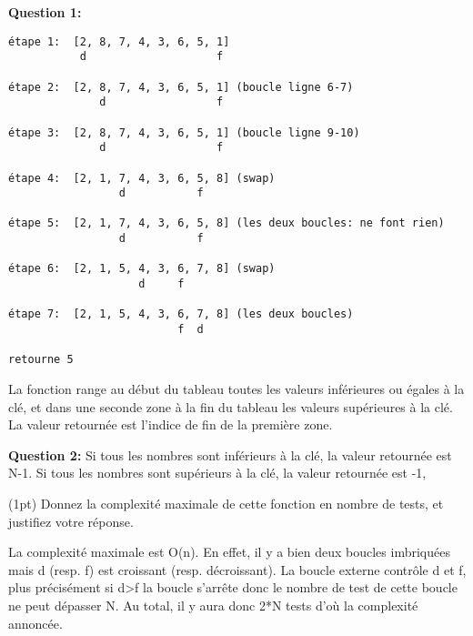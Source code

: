 \documentclass[10pt]{article}\usepackage[correction,nu]{esial}
\begin{document}
\begin{Reponse}
\noindent\textbf{Question 1:} 
\begin{Verbatim}[numbers=none]
étape 1:  [2, 8, 7, 4, 3, 6, 5, 1]
           d                    f

étape 2:  [2, 8, 7, 4, 3, 6, 5, 1] (boucle ligne 6-7)
              d                 f

étape 3:  [2, 8, 7, 4, 3, 6, 5, 1] (boucle ligne 9-10)
              d                 f

étape 4:  [2, 1, 7, 4, 3, 6, 5, 8] (swap)
                 d           f    

étape 5:  [2, 1, 7, 4, 3, 6, 5, 8] (les deux boucles: ne font rien)
                 d           f

étape 6:  [2, 1, 5, 4, 3, 6, 7, 8] (swap)
                    d     f   

étape 7:  [2, 1, 5, 4, 3, 6, 7, 8] (les deux boucles)
                          f  d 

retourne 5
\end{Verbatim}


La fonction range au début du tableau toutes les valeurs inférieures ou égales à
la clé, et dans une seconde zone à la fin du tableau les valeurs supérieures à
la clé. La valeur retournée est l'indice de fin de la première zone.


\noindent\textbf{Question 2:} 
Si tous les nombres sont inférieurs à la clé, la valeur retournée est N-1. Si tous les nombres sont
supérieurs à la clé, la valeur retournée est -1,
\end{Reponse}

\Question(1pt) Donnez la complexité maximale de cette fonction en nombre de tests, et
justifiez votre réponse.
\begin{Reponse}
  La complexité maximale est O(n). En effet, il y a bien deux boucles
  imbriquées mais d (resp. f) est croissant (resp. décroissant). La boucle
  externe contrôle d et f, plus précisément si d>f la boucle s'arrête donc le
  nombre de test de cette boucle ne peut dépasser N. Au total, il y aura donc
  2*N tests d'où la complexité annoncée.
\end{Reponse}





\end{document}
